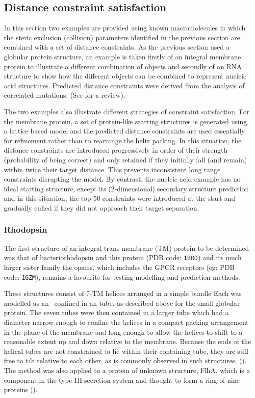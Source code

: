 \subsection{Distance constraint satisfaction}

In this section two examples are provided using known macromolecules in
which the steric exclusion (collision) parameters identified in the previous section are
combined with a set of distance constraints.
As the previous section used a globular protein structure, an example is
taken firstly of an integral membrane protein to illustrate a different 
combination of objects and secondly of an RNA structure to show how the
different objects can be combined to represent nucleic acid structures.
Predicted distance constraints were derived from the analysis of correlated
mutations.  (See \cite{TaylorWRet13} for a review).

The two examples also illustrate different strategies of constraint
satisfaction.   For the membrane protein, a set of protein-like starting 
structures is generated using a lattice based model \cite{TaylorWRet94a} and the
predicted distance constraints are used essentially for refinement rather
than to rearrange the helix packing.  In this situation, the distance
constraints are introduced progressively in order of their strength
(probability of being correct) and only retained if they initially
fall (and remain) within twice their target distance.   This prevents
inconsistent long range constraints disrupting the model.  By contrast,
the nucleic acid example has no ideal starting structure, except its
(2-dimensional) secondary structure prediction and in this situation,
the top 50 constraints were introduced at the start and gradually culled
if they did not approach their target separation.  

\subsubsection{Rhodopsin}

The first structure of an integral trans-membrane (TM) protein to be determined
was that of bacteriorhodopsin and this protein (PDB code: {\tt 1BRD}) and its
much larger sister family the opsins, which includes the GPCR receptors (eg: PDB code:
{\tt 1GZM}), remains a favourite for testing modelling and prediction methods.

These structures consist of 7-TM helices arranged in a simple bundle
Each was modelled as an \AH\ confined in an tube, as described above for the
small globular protein.   The seven tubes were then contained in a larger
tube which had a diameter narrow enough to confine the helices in a compact
packing arrangement in the plane of the membrane and long enough to allow 
the helices to shift to a reasonable extent up and down relative to the membrane.  
Because the ends of the helical tubes are not constrained to lie within their
containing tube, they are still free to tilt relative to each other, as is
commonly observed in such structures.  ().
The method was also applied to a protein of unknown structure, FlhA, which is
a component in the type-III secretion system and thought to form a ring
of nine proteins ().

